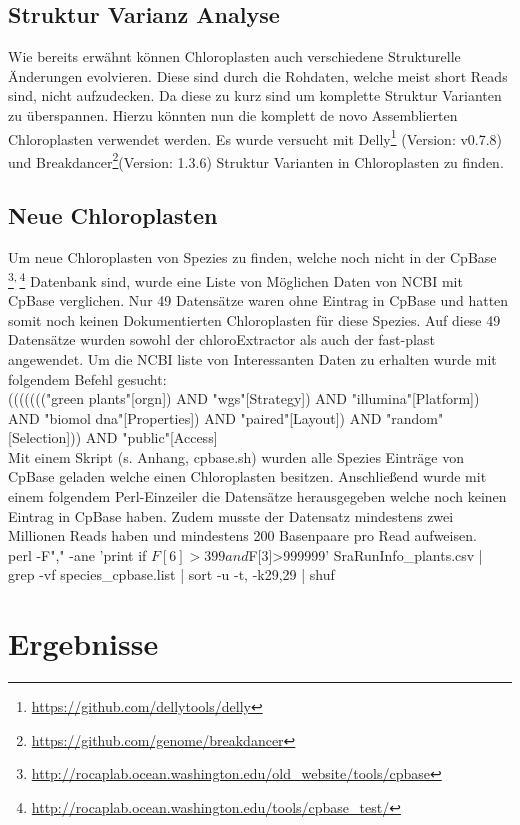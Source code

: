 \documentclass{scrartcl}
\begin{document}
\subsection{Struktur Varianz Analyse}
\label{sec-3-4}
Wie bereits erwähnt können Chloroplasten auch verschiedene Strukturelle Änderungen evolvieren. Diese sind durch die Rohdaten, welche meist short Reads sind, nicht aufzudecken.
Da diese zu kurz sind um komplette Struktur Varianten zu überspannen.\footnotemark[7]{} Hierzu könnten nun die komplett de novo Assemblierten Chloroplasten verwendet werden.
Es wurde versucht mit Delly\footnote{\url{https://github.com/dellytools/delly}} (Version: v0.7.8) und Breakdancer\footnote{\url{https://github.com/genome/breakdancer}}(Version: 1.3.6) Struktur Varianten in Chloroplasten zu finden.  

\subsection{Neue Chloroplasten}
\label{sec-3-5}
Um neue Chloroplasten von Spezies zu finden, welche noch nicht in der CpBase \footnote{\url{http://rocaplab.ocean.washington.edu/old_website/tools/cpbase}}\textsuperscript{,}\,\footnote{\url{http://rocaplab.ocean.washington.edu/tools/cpbase_test/}} Datenbank sind, wurde eine Liste von Möglichen Daten von NCBI mit CpBase verglichen. Nur 49 Datensätze waren ohne 
Eintrag in CpBase und hatten somit noch keinen Dokumentierten Chloroplasten für diese Spezies. Auf diese 49 Datensätze wurden sowohl der chloroExtractor als auch der fast-plast angewendet. 
Um die NCBI liste von Interessanten Daten zu erhalten wurde mit folgendem Befehl gesucht:
\\
((((((("green plants"[orgn]) AND "wgs"[Strategy]) AND "illumina"[Platform]) AND "biomol dna"[Properties]) AND "paired"[Layout]) AND "random"[Selection])) AND "public"[Access]
\\
Mit einem Skript (s. Anhang, cpbase.sh) wurden alle Spezies Einträge von CpBase geladen welche einen Chloroplasten besitzen. Anschließend wurde mit einem folgendem Perl-Einzeiler
die Datensätze herausgegeben welche noch keinen Eintrag in CpBase haben. Zudem musste der Datensatz mindestens zwei Millionen Reads haben und mindestens 200 Basenpaare pro Read
aufweisen.
\\
perl -F"," -ane 'print if $F[6]>399 and $F[3]>999999' SraRunInfo\_plants.csv | grep -vf species\_cpbase.list | sort -u -t, -k29,29 | shuf



\section{Ergebnisse}
\label{sec-4}
\end{document}
